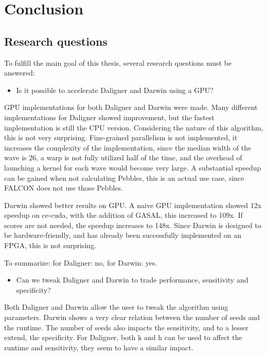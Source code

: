\documentclass[../thesis.tex]{subfiles}
\begin{document}
\chapter{Conclusion}
\ifdefined\main
\else

\fi



\section{Research questions}
To fulfill the main goal of this thesis, several research questions must be answered:

\begin{itemize}
\item Is it possible to accelerate Daligner and Darwin using a GPU?
\end{itemize}
GPU implementations for both Daligner and Darwin were made.
Many different implementations for Daligner showed improvement, but the fastest implementation is still the CPU version.
Considering the nature of this algorithm, this is not very surprising.
Fine-grained parallelism is not implemented, it increases the complexity of the implementation, since the median width of the wave is 26, a warp is not fully utilized half of the time, and the overhead of launching a kernel for each wave would become very large.
A substantial speedup can be gained when not calculating Pebbles, this is an actual use case, since FALCON does not use those Pebbles.

Darwin showed better results on GPU.
A naive GPU implementation showed 12x speedup on ce-cuda, with the addition of GASAL, this increased to 109x.
If scores are not needed, the speedup increases to 148x.
Since Darwin is designed to be hardware-friendly, and has already been successfully implemented on an FPGA, this is not surprising.

To summarize: for Daligner: no, for Darwin: yes.


\begin{itemize}
\item Can we tweak Daligner and Darwin to trade performance, sensitivity and specificity?
\end{itemize}
Both Daligner and Darwin allow the user to tweak the algorithm using parameters.
Darwin shows a very clear relation between the number of seeds and the runtime.
The number of seeds also impacts the sensitivity, and to a lesser extend, the specificity.
For Daligner, both k and h can be used to affect the runtime and sensitivity, they seem to have a similar impact.
\end{document}
